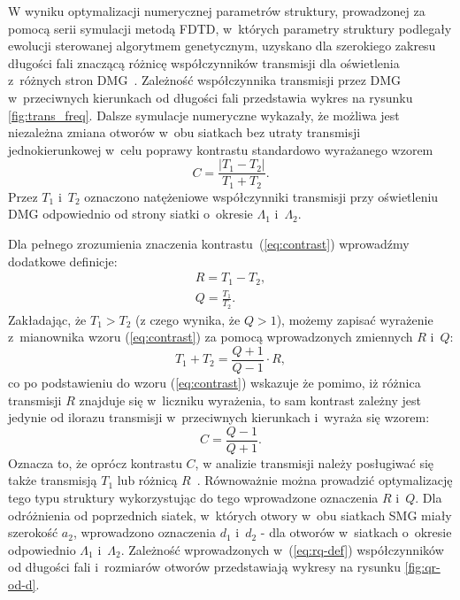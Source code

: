 W wyniku optymalizacji numerycznej parametrów struktury, prowadzonej za pomocą serii symulacji metodą FDTD, w~których parametry struktury podlegały ewolucji sterowanej algorytmem genetycznym, uzyskano dla szerokiego zakresu długości fali znaczącą różnicę współczynników transmisji dla oświetlenia z~różnych stron DMG~\cite{Stolarek:13}. Zależność współczynnika transmisji przez DMG w~przeciwnych kierunkach od długości fali przedstawia wykres na rysunku \ref{fig:trans_freq}. Dalsze symulacje numeryczne wykazały, że możliwa jest niezależna zmiana otworów w~obu siatkach bez utraty transmisji jednokierunkowej w~celu poprawy kontrastu standardowo wyrażanego wzorem
\begin{equation}
C=\frac{|T_1 - T_2|}{T_1+T_2}.
\label{eq:contrast}
\end{equation}
Przez $T_1$ i~$T_2$ oznaczono natężeniowe współczynniki transmisji przy oświetleniu DMG odpowiednio od strony siatki o~okresie $\Lambda_1$ i~$\Lambda_2$.

Dla pełnego zrozumienia znaczenia kontrastu~(\ref{eq:contrast}) wprowadźmy dodatkowe definicje:
\begin{equation}
	\begin{gathered}
	R=T_1-T_2, \\
	Q=\frac{T_1}{T_2}.
	\end{gathered}
	\label{eq:rq-def}
\end{equation}
Zakładając, że $T_1>T_2$ (z czego wynika, że $Q>1$), możemy zapisać wyrażenie z~mianownika wzoru (\ref{eq:contrast}) za pomocą wprowadzonych zmiennych $R$ i~$Q$:
\begin{equation}
	T_1+T_2=\frac{Q+1}{Q-1} \cdot R,
\end{equation}
co po podstawieniu do wzoru (\ref{eq:contrast}) wskazuje że pomimo, iż różnica transmisji $R$  znajduje się w~liczniku wyrażenia, to sam kontrast zależny jest jedynie od ilorazu transmisji w~przeciwnych kierunkach i~wyraża się wzorem:
\begin{equation}
	C=\frac{Q-1}{Q+1}
	\label{eq:contrast-Q}.
\end{equation}
Oznacza to, że oprócz kontrastu $C$, w analizie transmisji należy posługiwać się także transmisją $T_1$ lub różnicą $R$~\cite{stolarek2013broadband}. Równoważnie można prowadzić optymalizację tego typu struktury wykorzystując do tego wprowadzone oznaczenia $R$ i~$Q$. Dla odróżnienia od poprzednich siatek, w~których otwory w~obu siatkach SMG miały szerokość $a_2$, wprowadzono oznaczenia $d_1$ i~$d_2$ - dla otworów w~siatkach o~okresie odpowiednio $\Lambda_1$ i~$\Lambda_2$. Zależność wprowadzonych w~(\ref{eq:rq-def}) współczynników od długości fali i~rozmiarów otworów przedstawiają wykresy na rysunku \ref{fig:qr-od-d}.

